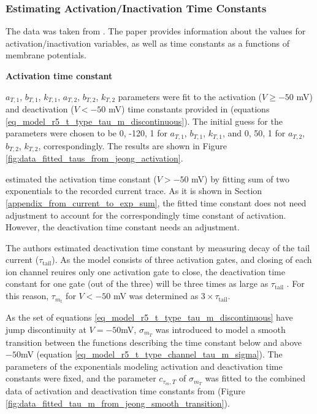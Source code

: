 \documentclass[../../workflow.tex]{subfiles}
\begin{document}
\subsubsection{Estimating Activation/Inactivation Time Constants}\label{sec_model_t_type_channel_time_constants}

The data was taken from \parencite{jeongCaa1TFlyTtype2015}. The paper provides
information about the values for activation/inactivation variables, as well as time constants
as a functions of membrane potentials. 

\textbf{Activation time constant}

$a_{T,1}$, $b_{T,1}$, $k_{T,1}$, $a_{T,2}$, $b_{T,2}$, $k_{T,2}$ parameters were fit to the activation
($V \geq -50$ mV) and deactivation ($V < -50$ mV) time constants provided in \parencite{jeongCaa1TFlyTtype2015}
(equations \ref{eq_model_r5_t_type_tau_m_discontinuous}).
The initial guess for the parameters were chosen to be 0, -120, 1 for $a_{T,1}$, $b_{T,1}$, $k_{T,1}$,
and 0, 50, 1 for $a_{T,2}$, $b_{T,2}$, $k_{T,2}$, correspondingly. The results are shown in Figure
\ref{fig:data_fitted_taus_from_jeong_activation}.

\parencite{jeongCaa1TFlyTtype2015} estimated the activation time constant ($V>-50$ mV) by fitting
sum of two exponentials to the recorded current trace. As it is shown in Section \ref{appendix_from_current_to_exp_sum},
the fitted time constant does not need adjustment to account for the correspondingly
time constant of activation. However, the deactivation time constant needs an adjustment.

The authors estimated deactivation time constant by measuring decay of the tail current ($\tau_{\text{tail}}$).
As the model consists of three activation gates, and closing of each ion channel reuires
only one activation gate to close, the deactivation time constant for one gate (out of the three)
will be three times as large as $\tau_{\text{tail}}$ \parencite{huguenardSimulationCurrentsInvolved1992}.
For this reason, $\tau_{m_t}$ for $V<-50$ mV was determined as $3\times\tau_{\text{tail}}$.

As the set of equations \ref{eq_model_r5_t_type_tau_m_discontinuous} have jump discontinuity at
$V=-50$mV, $\sigma_{m_T}$ was introduced to model a smooth transition between the functions
describing the time constant below and above $-50$mV (equation \ref{eq_model_r5_t_type_channel_tau_m_sigma}).
The parameters of the exponentials modeling activation and deactivation time constants were
fixed, and the parameter $c_{\tau_m,T}$ of $\sigma_{m_T}$ was fitted to the combined data of activation
and deactivation time constants from \parencite{jeongCaa1TFlyTtype2015} (Figure \ref{fig:data_fitted_tau_m_from_jeong_smooth_transition}).
\end{document}

